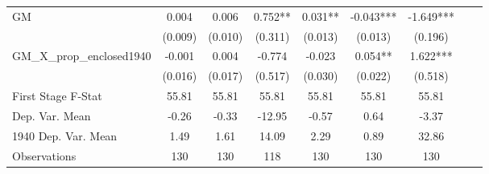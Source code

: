 \begin{tabular}{l*{8}{c}}
\cmidrule(lr){1-7}
GM              &    0.004   &    0.006   &    0.752** &    0.031** &   -0.043***&   -1.649***\\
                &  (0.009)   &  (0.010)   &  (0.311)   &  (0.013)   &  (0.013)   &  (0.196)   \\
\addlinespace
GM\_X\_prop\_enclosed1940&   -0.001   &    0.004   &   -0.774   &   -0.023   &    0.054** &    1.622***\\
                &  (0.016)   &  (0.017)   &  (0.517)   &  (0.030)   &  (0.022)   &  (0.518)   \\
\midrule
First Stage F-Stat&    55.81   &    55.81   &    55.81   &    55.81   &    55.81   &    55.81   \\
Dep. Var. Mean  &    -0.26   &    -0.33   &   -12.95   &    -0.57   &     0.64   &    -3.37   \\
1940 Dep. Var. Mean&     1.49   &     1.61   &    14.09   &     2.29   &     0.89   &    32.86   \\
Observations    &      130   &      130   &      118   &      130   &      130   &      130   \\
 \bottomrule \end{tabular}
